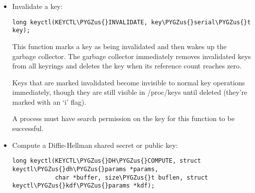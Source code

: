 \documentclass[a4paper,8pt,english]{sphinxmanual}
\def\PYGZus{\char`\_}
\begin{document}
\begin{itemize}
\begin{Verbatim}[commandchars=\\\{\}]
long keyctl(KEYCTL\PYGZus{}SESSION\PYGZus{}TO\PYGZus{}PARENT);
\end{Verbatim}

This functions attempts to install the calling process's session keyring
on to the calling process's parent, replacing the parent's current session
keyring.

The calling process must have the same ownership as its parent, the
keyring must have the same ownership as the calling process, the calling
process must have LINK permission on the keyring and the active LSM module
mustn't deny permission, otherwise error EPERM will be returned.

Error ENOMEM will be returned if there was insufficient memory to complete
the operation, otherwise 0 will be returned to indicate success.

The keyring will be replaced next time the parent process leaves the
kernel and resumes executing userspace.

\item {} 
Invalidate a key:

\begin{Verbatim}[commandchars=\\\{\}]
long keyctl(KEYCTL\PYGZus{}INVALIDATE, key\PYGZus{}serial\PYGZus{}t key);
\end{Verbatim}

This function marks a key as being invalidated and then wakes up the
garbage collector.  The garbage collector immediately removes invalidated
keys from all keyrings and deletes the key when its reference count
reaches zero.

Keys that are marked invalidated become invisible to normal key operations
immediately, though they are still visible in /proc/keys until deleted
(they're marked with an `i' flag).

A process must have search permission on the key for this function to be
successful.

\item {} 
Compute a Diffie-Hellman shared secret or public key:

\begin{Verbatim}[commandchars=\\\{\}]
long keyctl(KEYCTL\PYGZus{}DH\PYGZus{}COMPUTE, struct keyctl\PYGZus{}dh\PYGZus{}params *params,
            char *buffer, size\PYGZus{}t buflen, struct keyctl\PYGZus{}kdf\PYGZus{}params *kdf);
\end{Verbatim}


\end{itemize}
\end{document}
